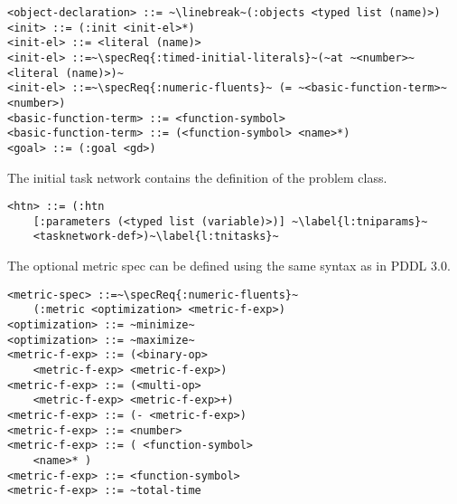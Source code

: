 \documentclass[letterpaper]{article} %
\begin{document}
\begin{lstlisting}[firstnumber=last, escapechar=~]
<object-declaration> ::= ~\linebreak~(:objects <typed list (name)>)
<init> ::= (:init <init-el>*)
<init-el> ::= <literal (name)>
<init-el> ::=~\specReq{:timed-initial-literals}~(~at ~<number>~ <literal (name)>)~
<init-el> ::=~\specReq{:numeric-fluents}~ (= ~<basic-function-term>~ <number>)
<basic-function-term> ::= <function-symbol>
<basic-function-term> ::= (<function-symbol> <name>*)
<goal> ::= (:goal <gd>)
\end{lstlisting}

The initial task network contains the definition of the problem class.

\begin{lstlisting}[firstnumber=last, escapechar=~]
<htn> ::= (:htn
    [:parameters (<typed list (variable)>)] ~\label{l:tniparams}~
    <tasknetwork-def>)~\label{l:tnitasks}~
\end{lstlisting} %

%
%

The optional metric spec can be defined using the same syntax as in PDDL 3.0.

\begin{lstlisting}[firstnumber=last, escapechar=~]
<metric-spec> ::=~\specReq{:numeric-fluents}~
    (:metric <optimization> <metric-f-exp>)
<optimization> ::= ~minimize~
<optimization> ::= ~maximize~
<metric-f-exp> ::= (<binary-op>
    <metric-f-exp> <metric-f-exp>)
<metric-f-exp> ::= (<multi-op>
    <metric-f-exp> <metric-f-exp>+)
<metric-f-exp> ::= (- <metric-f-exp>)
<metric-f-exp> ::= <number>
<metric-f-exp> ::= ( <function-symbol>
    <name>* )
<metric-f-exp> ::= <function-symbol>
<metric-f-exp> ::= ~total-time
\end{lstlisting}
\end{document}
